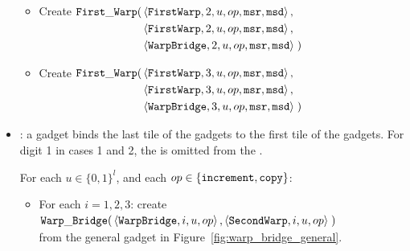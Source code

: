 \begin{itemize}
\begin{itemize}
                \item Create
                $\begin{aligned}[t]
                    \firstwarp(& \left\langle {\tt FirstWarp},  2, u, \inc, {\tt msr}, {\tt msd} \right\rangle, \\ %
                               & \left\langle {\tt FirstWarp},  2, u, \inc, {\tt msr}, {\tt msd} \right\rangle, \\ %
                               & \left\langle {\tt WarpBridge}, 2, u, \inc, {\tt msr}, {\tt msd} \right\rangle \;) %
                \end{aligned}$
                \vspace{.5cm}

                \item Create
                $\begin{aligned}[t]
                    \firstwarp(& \left\langle {\tt FirstWarp},  3, u, \inc, {\tt msr}, {\tt msd} \right\rangle,\\  %
                               & \left\langle {\tt FirstWarp},  3, u, \inc, {\tt msr}, {\tt msd} \right\rangle,\\  %
                               & \left\langle {\tt WarpBridge}, 3, u, \inc, {\tt msr}, {\tt msd} \right\rangle \;) %
                \end{aligned}$
                \vspace{.5cm}

            \end{itemize}
        \vspace{.5cm}

        \item {\warpbridge}: a {\warpbridge} gadget binds the last tile of the {\firstwarp} gadgets to the
             first tile of the {\secondwarp} gadgets. For digit 1 in cases 1 and 2, the
             {\warpbridge} is omitted from the {\warpunit}.

        For each $u \in \{0, 1\}^l$, and each $op \in \{ {\tt increment, copy } \}$:
        \begin{itemize}

            \item For each $i = 1,2,3$: create
            $\begin{aligned}[t]
                {\tt Warp\_Bridge}(& \left\langle {\tt WarpBridge}, i, u, op \right\rangle,
                              \left\langle {\tt SecondWarp}, i, u, op \right\rangle \;)
            \end{aligned}$ \\ from the general gadget in Figure~\ref{fig:warp_bridge_general}.
            \vspace{.5cm}


\end{itemize}
\end{itemize}
